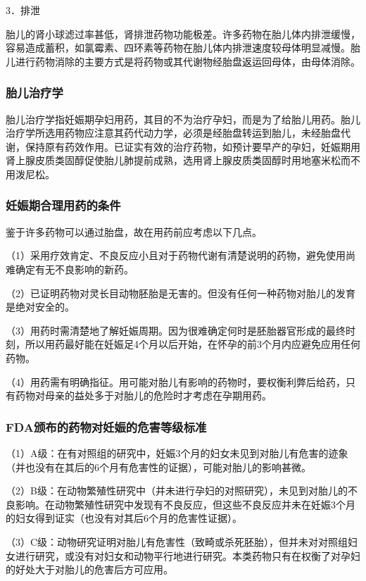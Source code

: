 3．排泄

胎儿的肾小球滤过率甚低，肾排泄药物功能极差。许多药物在胎儿体内排泄缓慢，容易造成蓄积，如氯霉素、四环素等药物在胎儿体内排泄速度较母体明显减慢。胎儿进行药物消除的主要方式是将药物或其代谢物经胎盘返运回母体，由母体消除。

\subsubsection{胎儿治疗学}

胎儿治疗学指妊娠期孕妇用药，其目的不为治疗孕妇，而是为了给胎儿用药。胎儿治疗学所选用药物应注意其药代动力学，必须是经胎盘转运到胎儿，未经胎盘代谢，保持原有药效作用。已证实有效的治疗药物，如预计要早产的孕妇，妊娠期用肾上腺皮质类固醇促使胎儿肺提前成熟，选用肾上腺皮质类固醇时用地塞米松而不用泼尼松。

\subsubsection{妊娠期合理用药的条件}

鉴于许多药物可以通过胎盘，故在用药前应考虑以下几点。

（1）采用疗效肯定、不良反应小且对于药物代谢有清楚说明的药物，避免使用尚难确定有无不良影响的新药。

（2）已证明药物对灵长目动物胚胎是无害的。但没有任何一种药物对胎儿的发育是绝对安全的。

（3）用药时需清楚地了解妊娠周期。因为很难确定何时是胚胎器官形成的最终时刻，所以用药最好能在妊娠足4个月以后开始，在怀孕的前3个月内应避免应用任何药物。

（4）用药需有明确指征。用可能对胎儿有影响的药物时，要权衡利弊后给药，只有药物对母亲的益处多于对胎儿的危险时才考虑在孕期用药。

\subsubsection{FDA颁布的药物对妊娠的危害等级标准}

（1）A级：在有对照组的研究中，妊娠3个月的妇女未见到对胎儿有危害的迹象（并也没有在其后的6个月有危害性的证据），可能对胎儿的影响甚微。

（2）B级：在动物繁殖性研究中（并未进行孕妇的对照研究），未见到对胎儿的不良影响。在动物繁殖性研究中发现有不良反应，但这些不良反应并未在妊娠3个月的妇女得到证实（也没有对其后6个月的危害性证据）。

（3）C级：动物研究证明对胎儿有危害性（致畸或杀死胚胎），但并未对对照组妇女进行研究，或没有对妇女和动物平行地进行研究。本类药物只有在权衡了对孕妇的好处大于对胎儿的危害后方可应用。

